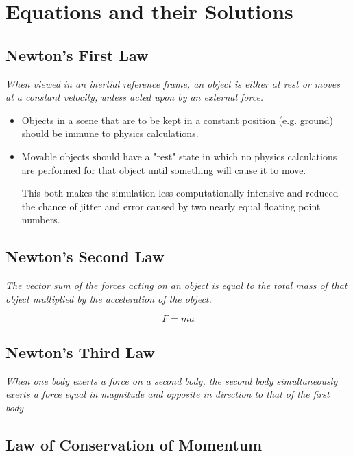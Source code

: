 \documentclass[a4paper]{article}
\begin{document}
\tableofcontents

\section{Equations and their Solutions}
\label{sec:equations_and_their_solutions}

\subsection{Newton's First Law}

\textit{When viewed in an inertial reference frame, an object is either at rest
or moves at a constant velocity, unless acted upon by an external force.}

\begin{itemize}
  \item
    Objects in a scene that are to be kept in a constant position (e.g. ground)
    should be immune to physics calculations.

  \item
    Movable objects should have a "rest" state in which no physics calculations
    are performed for that object until something will cause it to move.

    This both makes the simulation less computationally intensive and reduced
    the chance of jitter and error caused by two nearly equal floating point
    numbers.
\end{itemize}

\subsection{Newton's Second Law}

\textit{The vector sum of the forces acting on an object is equal to the total
mass of that object multiplied by the acceleration of the object.}

\[
  F = ma
\]

\subsection{Newton's Third Law}

\textit{When one body exerts a force on a second body, the second body
simultaneously exerts a force equal in magnitude and opposite in direction to
that of the first body.}

\subsection{Law of Conservation of Momentum}
\end{document}
